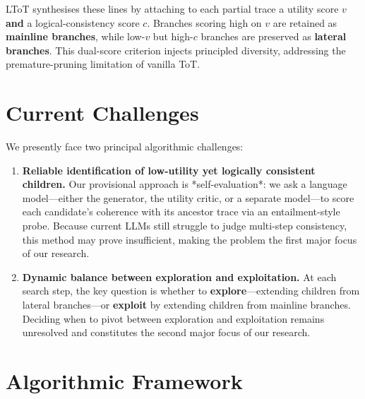 \documentclass{IEEEtran}
\begin{document}
LToT synthesises these lines by attaching to each partial trace a utility score $v$ \textbf{and} a logical-consistency score $c$.
Branches scoring high on $v$ are retained as \textbf{mainline branches}, while low-$v$ but high-$c$ branches are preserved as \textbf{lateral branches}.
This dual-score criterion injects principled diversity, addressing the premature-pruning limitation of vanilla ToT.


\section{Current Challenges}
\label{section:current-challenges}

We presently face two principal algorithmic challenges:

\begin{enumerate}
   \item
      \textbf{Reliable identification of low-utility yet logically consistent children.}
      Our provisional approach is *self-evaluation*: we ask a language model—either the generator, the utility critic, or a separate model—to score each candidate's coherence with its ancestor trace via an entailment-style probe.
      Because current LLMs still struggle to judge multi-step consistency, this method may prove insufficient, making the problem the first major focus of our research.
   \item
      \textbf{Dynamic balance between exploration and exploitation.}
      At each search step, the key question is whether to \textbf{explore}---extending children from lateral branches---or \textbf{exploit} by extending children from mainline branches.
      Deciding when to pivot between exploration and exploitation remains unresolved and constitutes the second major focus of our research.
\end{enumerate}


\section{Algorithmic Framework}
\label{section:algorithmic-framework}
\end{document}
